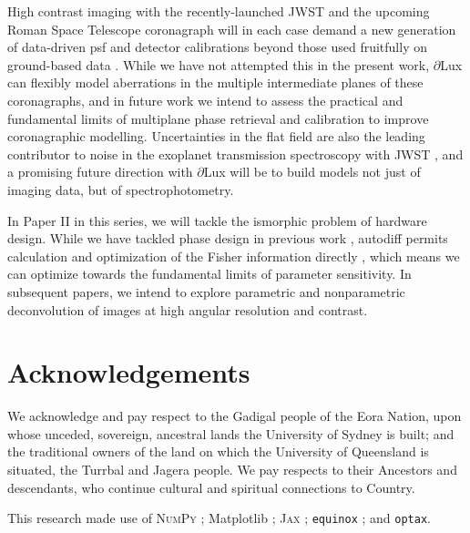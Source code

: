 \documentclass[]{spieman}
\newcommand\dlux{$\partial$Lux\xspace}
\newcommand\optax{\texttt{optax}\xspace}
\begin{document}
High contrast imaging with the recently-launched JWST \cite{Gardner2006} and the upcoming Roman Space Telescope coronagraph \cite{Zellem2022} will in each case demand a new generation of data-driven \ac{psf} and detector calibrations beyond those used fruitfully on ground-based data \cite{Cantalloube2021}. While we have not attempted this in the present work, \dlux can flexibly model aberrations in the multiple intermediate planes of these coronagraphs, and in future work we intend to assess the practical and fundamental limits of multiplane phase retrieval and calibration to improve coronagraphic modelling.
Uncertainties in the flat field are also the leading contributor to noise in the exoplanet transmission spectroscopy with JWST \cite{Rustamkulov2022}, and a promising future direction with \dlux will be to build models not just of imaging data, but of spectrophotometry.

In Paper II in this series, we will tackle the ismorphic problem of hardware design. While we have tackled phase design in previous work \cite{phase_ret_and_design}, autodiff permits calculation and optimization of the Fisher information directly \cite{Coe2009}, which means we can optimize towards the fundamental limits of parameter sensitivity. In subsequent papers, we intend to explore parametric and nonparametric deconvolution of images at high angular resolution and contrast.


\section{Acknowledgements}

We acknowledge and pay respect to the Gadigal people of the Eora Nation, upon whose unceded, sovereign, ancestral lands the University of Sydney is built; and the traditional owners of the land on which the University of Queensland is situated, the Turrbal and Jagera people. We pay respects to their Ancestors and descendants, who continue cultural and spiritual connections to Country. 

This research made use of \textsc{NumPy} \cite{numpy}; Matplotlib \cite{matplotlib}; \textsc{Jax} \cite{jax}; \texttt{equinox} \cite{kidger2021equinox}; and \optax \cite{optax2020github}.


\end{document}
